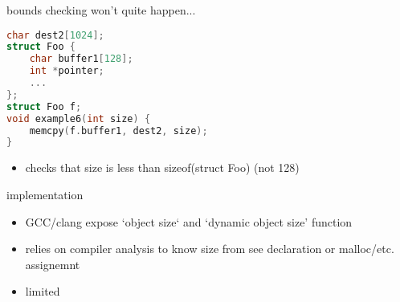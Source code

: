 \begin{frame}[fragile,label=fortifySourceExample4]{bounds checking won't quite happen...}
\begin{lstlisting}[language=C,style=smaller]
char dest2[1024];
struct Foo {
    char buffer1[128];
    int *pointer;
    ...
};
struct Foo f;
void example6(int size) {
    memcpy(f.buffer1, dest2, size);
}
\end{lstlisting}
\begin{itemize}
\item checks that size is less than sizeof(struct Foo) (not 128)
\end{itemize}
\end{frame}

\begin{frame}{implementation}
    \begin{itemize}
    \item GCC/clang expose `object size` and `dynamic object size' function
    \item relies on compiler analysis to know size from see declaration or malloc/etc. assignemnt
    \vspace{.5cm}
    \item limited
    \end{itemize}
\end{frame}
